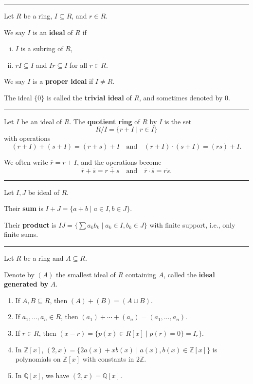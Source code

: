\documentclass[12pt]{article}
\newcommand{\keyword}[1]{\textbf{#1}}
\newcommand{\sepline}{\rule{\textwidth}{0.4pt}}
\theoremstyle{definition}
\newcommand{\isp}[1]{\quad\text{#1}\quad}
\newcommand{\Z}{\mathbb{Z}}
\newcommand{\Q}{\mathbb{Q}}
\newcommand{\<}{\left\langle}
\renewcommand{\>}{\right\rangle}
\newcommand{\seq}{\subseteq}
\newcommand{\eqc}{\overline}
\begin{document}
\sepline

Let $R$ be a ring, $I \seq R$, and $r \in R$.

We say $I$ is an \keyword{ideal} of $R$ if
\begin{enumerate}[(i)]
    \item $I$ is a subring of $R$,
    \item $rI \seq I$ and $Ir \seq I$ for all $r \in R$.
\end{enumerate}

We say $I$ is a \keyword{proper ideal} if $I \ne R$.

The ideal $\{0\}$ is called the \keyword{trivial ideal} of $R$, and sometimes denoted by $0$.

\sepline

Let $I$ be an ideal of $R$. The \keyword{quotient ring} of $R$ by $I$ is the set
\[
    R/I = \{r + I \mid r \in I\}
\]
with operations
\[
    (r+I) + (s+I) = (r+s) + I \isp{and} (r+I) \cdot (s+I) = (rs) + I.
\]

We often write $\eqc{r} = r + I$, and the operations become
\[
    \eqc{r} + \eqc{s} = \eqc{r + s} \isp{and} \eqc{r} \cdot \eqc{s} = \eqc{rs}.
\]

\sepline

Let $I, J$ be ideal of $R$.

Their \keyword{sum} is $I+J = \{a+b \mid a \in I, b \in J\}$.

Their \keyword{product} is $IJ = \{\sum a_kb_k \mid a_k \in I, b_k \in J\}$ with finite support, i.e., only finite sums.

\sepline

Let $R$ be a ring and $A \seq R$.

Denote by $(A)$ the smallest ideal of $R$ containing $A$, called the \keyword{ideal generated by} $A$.

\begin{enumerate}
    \item If $A, B \seq R$, then $(A) + (B) = (A \cup B)$.
    
    \item If $a_1, \dots, a_n \in R$, then $(a_1) + \cdots + (a_n) = (a_1, \dots, a_n)$.
    
    \item If $r \in R$, then $(x - r) = \{p(x) \in R[x] \mid p(r) = 0\} = I_r\}$.
    
    \item In $\Z[x]$, $(2, x) = \{2a(x) + xb(x) \mid a(x), b(x) \in \Z[x]\}$ is polynomials on $\Z[x]$ with constants in $2\Z$.
    
    \item In $\Q[x]$, we have $(2, x) = \Q[x]$.
\end{enumerate}
\end{document}
